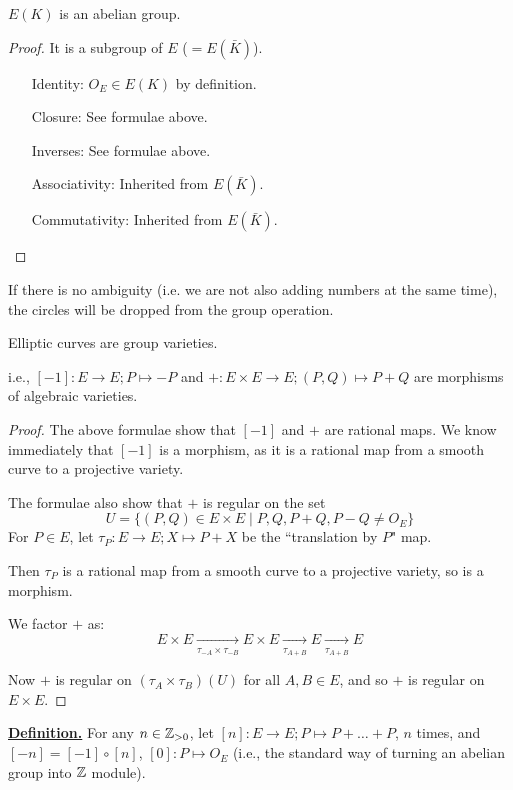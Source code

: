 \documentclass[10pt,a4paper]{article}
\begin{document}
\begin{corollary}
  $E(K)$ is an abelian group.
\end{corollary}
\begin{proof}
  It is a subgroup of $E$ ($=E(\bar{K})$).

  \begin{itemize}[leftmargin=2cm]
    \item[Identity:] $O_E \in E(K)$ by definition.
    \item[Closure:] See formulae above.
    \item[Inverses:] See formulae above.
    \item[Associativity:] Inherited from $E(\bar{K})$.
    \item[Commutativity:] Inherited from $E(\bar{K})$.
  \end{itemize}
\end{proof}

If there is no ambiguity (i.e. we are not also adding numbers at the same time), the circles will be dropped from the group operation.
\begin{theorem}
  Elliptic curves are group varieties.

  i.e., $[-1]:E \to E; P\mapsto -P$ and $+:E\times E \to E; (P,Q)\mapsto P+Q$ are morphisms of algebraic varieties.
\end{theorem}
\begin{proof}
  The above formulae show that $[-1]$ and $+$ are rational maps. We know immediately that $[-1]$ is a morphism, as it is a rational map from a smooth curve to a projective variety.

  The formulae also show that $+$ is regular on the set
  \[ U = \{(P,Q) \in E \times E \mid P, Q, P+Q, P-Q \neq O_E\}\]
  For $P \in E$, let $\tau_P:E \to E; X \mapsto P+X$ be the ``translation by $P$" map.

  Then $\tau_P$ is a rational map from a smooth curve to a projective variety, so is a morphism.

  We factor $+$ as:
  \[ E\times E\xrightarrow[\tau_{-A}\times \tau_{-B}]{}E\times E \xrightarrow[\tau_{A+B}]{} E \xrightarrow[\tau_{A+B}]{} E\]

  Now $+$ is regular on $(\tau_A \times \tau_B)(U)$ for all $A, B \in E$, and so $+$ is regular on $E \times E$.
\end{proof}

\underline{\textbf{Definition.}} For any $n \in \mathbb{Z}_{>0}$, let $[n]: E \to E; P \mapsto P+\ldots+P$, $n$ times, and $[-n] = [-1]\circ [n]$, $[0]:P \mapsto O_E$ (i.e., the standard way of turning an abelian group into $\mathbb{Z}$ module).
\end{document}
